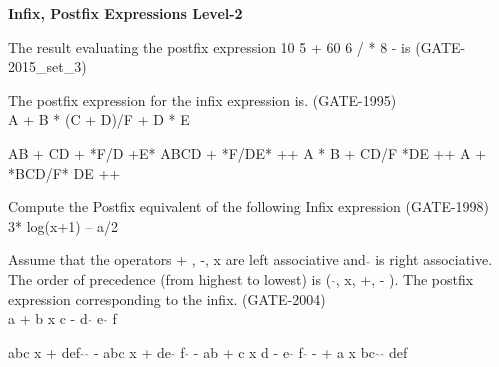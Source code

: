 
\centerline{\textbf{ \LARGE Infix, Postfix Expressions Level-2}}


\begin{questyle}
  \question  The result evaluating the postfix expression 10 5 + 60 6 / * 8 -  is  (GATE-2015\_set\_3)

  \begin{choices}
  \end{choices}
\end{questyle}


\begin{questyle}
  \question  The postfix expression for the infix expression is.  (GATE-1995)\\
              A + B * (C + D)/F + D * E

  \begin{choices}
    \choice         AB + CD + *F/D +E*
    \CorrectChoice  ABCD + *F/DE* ++
    \choice         A * B + CD/F *DE ++
    \choice         A + *BCD/F* DE ++
  \end{choices}
\end{questyle}


\begin{questyle}
  \question  Compute the Postfix equivalent of the following Infix expression \fillin[]  (GATE-1998) \\
              3* log(x+1) – a/2

\end{questyle}


\begin{questyle}
  \question   Assume that the operators + , -, x are left associative and \( \hat{} \) is right associative. The order of
              precedence (from highest to lowest) is (  \( \hat{} \), x, +, - ). The postfix expression corresponding to the infix. (GATE-2004) \\
              a + b x c - d \( \hat{} \) e \( \hat{} \) f

  \begin{choices}
    \CorrectChoice  abc x + def \( \hat{} \) \( \hat{} \) -
    \choice         abc x + de \( \hat{} \) f \( \hat{} \) -
    \choice         ab + c x d - e \( \hat{} \) f  \( \hat{} \)
    \choice         - + a x bc \( \hat{} \) \( \hat{} \) def
  \end{choices}
\end{questyle}

